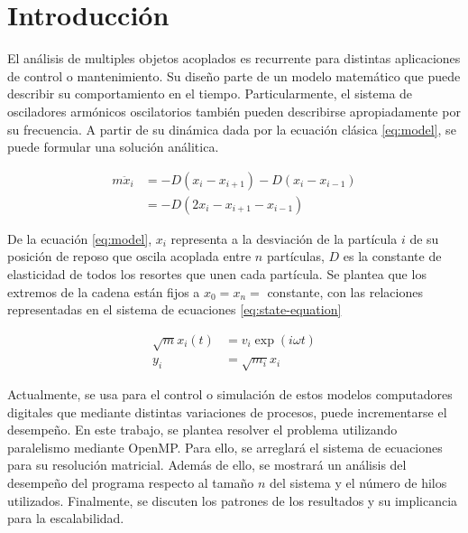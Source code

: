 \section{Introducción}
El análisis de multiples objetos acoplados es recurrente para distintas aplicaciones de control o mantenimiento. Su diseño parte de un modelo matemático que puede describir su comportamiento en el tiempo. Particularmente, el sistema de osciladores armónicos oscilatorios también pueden describirse apropiadamente por su frecuencia. A partir de su dinámica dada por la ecuación clásica \ref{eq:model}, se puede formular una solución análitica.

\begin{equation}
	\begin{split}
		m \ddot x_i & = -D(x_i - x_{i+1}) - D(x_i - x_{i-1}) \\
		& = -D(2x_i - x_{i+1} - x_{i-1})         
	\end{split}
	\label{eq:model}
\end{equation}

De la ecuación \ref{eq:model}, $x_i$ representa a la desviación de la partícula $i$ de su posición de reposo que oscila acoplada entre $n$ partículas, $D$ es la constante de elasticidad de todos los resortes que unen cada partícula. Se plantea que los extremos de la cadena están fijos a $x_0 = x_n = $ constante, con las relaciones representadas en el sistema de ecuaciones \ref{eq:state-equation}

\begin{equation}
	\begin{split}
		\sqrt{m} x_i(t) &= v_i \exp(i \omega t) 
		\\
		y_i &= \sqrt{m_i}x_i 
	\end{split}
	\label{eq:state-equation}
\end{equation}

Actualmente, se usa para el control o simulación de estos modelos computadores digitales que mediante distintas variaciones de procesos, puede incrementarse el desempeño. En este trabajo, se plantea resolver el problema utilizando paralelismo mediante OpenMP. Para ello, se arreglará el sistema de ecuaciones para su resolución matricial. Además de ello, se mostrará un análisis del desempeño del programa respecto al tamaño $n$ del sistema y el número de hilos utilizados. Finalmente, se discuten los patrones de los resultados y su implicancia para la escalabilidad.



